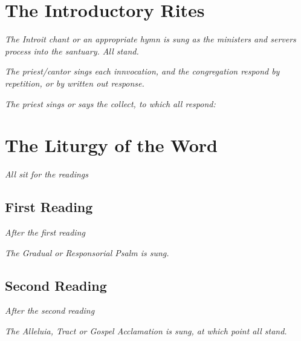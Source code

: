 \documentclass[a5paper,twoside]{article}
\begin{document}
\section*{The Introductory Rites}

\emph{The Introit chant or an appropriate hymn is sung as the ministers and servers process into the santuary. All stand.}

\priest\sign

\all\amen

\priest\greeting

\all\etcum

\priest\penitentialintro

\all\confiteor

\priest\absolution

\all\amen

\all\emph{The priest/cantor sings each innvocation, and the congregation respond by repetition, or by written out response.}

\kyrie

\gloria

\priest\oremus

\emph{The priest sings or says the collect, to which all respond:}

\all\amen

\section*{The Liturgy of the Word}

\emph{All sit for the readings}

\subsection*{First Reading}

\emph{After the first reading}

\reader\verbumdomini

\all\deogratiasa

\emph{The Gradual or Responsorial Psalm is sung.}

\subsection*{Second Reading}

\emph{After the second reading}

\reader\verbumdomini

\all\deogratiasb

\emph{The Alleluia, Tract or Gospel Acclamation is sung, at which point all stand.}
\end{document}
